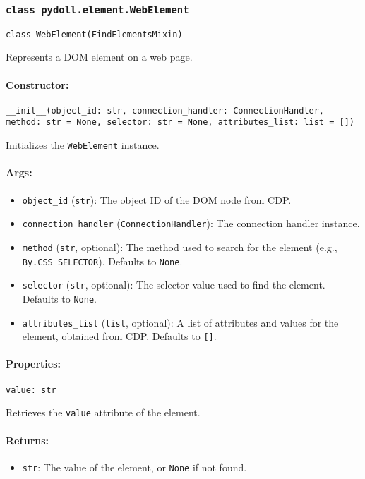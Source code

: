\documentclass{article}
\begin{document}
\subsubsection*{\texttt{class pydoll.element.WebElement}}
\noindent\texttt{class WebElement(FindElementsMixin)}

\noindent Represents a DOM element on a web page.

\paragraph{Constructor:}
\noindent\texttt{\_\_init\_\_(object\_id: str, connection\_handler: ConnectionHandler, method: str = None, selector: str = None, attributes\_list: list = [])}

\noindent Initializes the \texttt{WebElement} instance.

\paragraph{Args:}
\begin{itemize}
    \item \texttt{object\_id} (\texttt{str}): The object ID of the DOM node from CDP.
    \item \texttt{connection\_handler} (\texttt{ConnectionHandler}): The connection handler instance.
    \item \texttt{method} (\texttt{str}, optional): The method used to search for the element (e.g., \texttt{By.CSS\_SELECTOR}). Defaults to \texttt{None}.
    \item \texttt{selector} (\texttt{str}, optional): The selector value used to find the element. Defaults to \texttt{None}.
    \item \texttt{attributes\_list} (\texttt{list}, optional): A list of attributes and values for the element, obtained from CDP\@. Defaults to \texttt{[]}.
\end{itemize}

\paragraph{Properties:}
\noindent\texttt{value: str}

\noindent Retrieves the \texttt{value} attribute of the element.

\paragraph{Returns:}
\begin{itemize}
    \item \texttt{str}: The value of the element, or \texttt{None} if not found.
\end{itemize}
\end{document}
